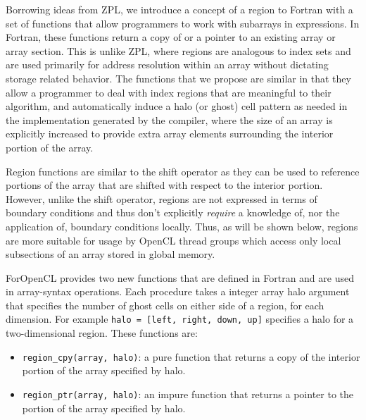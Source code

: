 Borrowing ideas from ZPL, we introduce a concept of a region to Fortran with a
set of functions that allow programmers to work with subarrays in expressions.
In Fortran, these functions return a copy of or a pointer to an existing array or array section.
This is unlike ZPL, where regions are analogous to index sets and are used
primarily for address resolution within an array without dictating storage
related behavior.  The functions that we propose are similar in that they allow
a programmer to deal with index regions that are meaningful to their algorithm,
and automatically induce a halo (or ghost) cell pattern as needed in the
implementation generated by the compiler, where the size of an array is
explicitly increased to provide extra array elements surrounding the interior portion of
the array.

Region functions are similar to the shift operator as they can be used to
reference portions of the array that are shifted with respect to the interior
portion.  However, unlike the shift operator, regions are not expressed in terms
of boundary conditions and thus don't explicitly \emph{require} a knowledge of,
nor the application of, boundary conditions locally.  Thus, as will be shown
below, regions are more suitable for usage by OpenCL thread groups which access
only local subsections of an array stored in global memory.

ForOpenCL provides two new functions that are defined in Fortran and are used
in array-syntax operations.  Each procedure takes a integer array halo argument
that specifies the number of ghost cells on either side of a region, for each
dimension.  For example {\tt halo = [left, right, down, up]} specifies a halo
for a two-dimensional region.  These functions are:

\begin{itemize}

\item {\tt region\_cpy(array, halo)}: a pure function that returns a copy of
  the interior portion of the array specified by halo.

\item {\tt region\_ptr(array, halo)}: an impure function that returns a pointer 
  to the portion of the array specified by halo.

\end{itemize}

